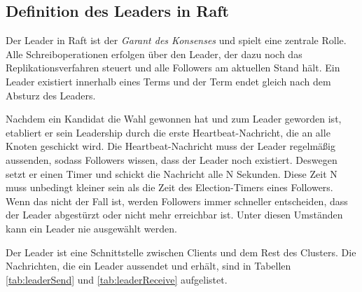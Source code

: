 \subsection{Definition des Leaders in Raft}

Der Leader in Raft ist der \textit{Garant des Konsenses} und spielt eine zentrale Rolle. Alle Schreiboperationen erfolgen über den Leader, der dazu noch das Replikationsverfahren steuert und alle Followers am aktuellen Stand hält. Ein Leader existiert innerhalb eines Terms und der Term endet gleich nach dem Absturz des Leaders.

Nachdem ein Kandidat die Wahl gewonnen hat und zum Leader geworden ist, etabliert er sein Leadership durch die erste Heartbeat-Nachricht, die an alle Knoten geschickt wird. Die Heartbeat-Nachricht muss der Leader regelmäßig aussenden, sodass Followers wissen, dass der Leader noch existiert. Deswegen setzt er einen Timer und schickt die Nachricht alle N Sekunden. Diese Zeit N muss unbedingt kleiner sein als die Zeit des Election-Timers eines Followers. Wenn das nicht der Fall ist, werden Followers immer schneller entscheiden, dass der Leader abgestürzt oder nicht mehr erreichbar ist. Unter diesen Umständen kann ein Leader nie ausgewählt werden.

Der Leader ist eine Schnittstelle zwischen Clients und dem Rest des Clusters. Die Nachrichten, die ein Leader aussendet und erhält, sind in Tabellen \ref{tab:leaderSend} und  \ref{tab:leaderReceive} aufgelistet.

